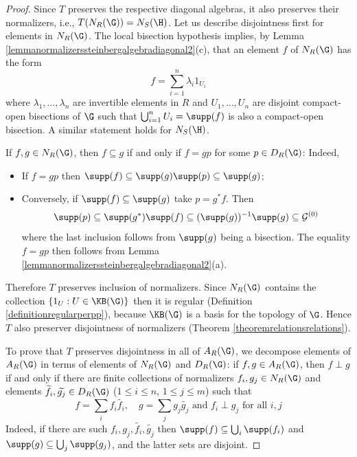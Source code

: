 \begin{proof}
Since $T$ preserves the respective diagonal algebras, it also preserves their normalizers, i.e., $T(N_R(\G))=N_S(\H)$. Let us describe disjointness first for elements in $N_R(\G)$. The local bisection hypothesis implies, by Lemma \ref{lemmanormalizerssteinbergalgebradiagonal2}(c), that an element $f$ of $N_R(\G)$ has the form
\[f=\sum_{i=1}^n\lambda_i1_{U_i}\]
where $\lambda_1,\ldots,\lambda_n$ are invertible elements in $R$ and $U_1,\ldots,U_n$ are disjoint compact-open bisections of $\G$ such that $\bigcup_{i=1}^n U_i=\supp(f)$ is also a compact-open bisection. A similar statement holds for $N_S(\H)$.

If $f,g\in N_R(\G)$, then $f\subseteq g$ if and only if $f=g p$ for some $p\in D_R(\G)$: Indeed,
\begin{itemize}
\item If $f=gp$ then $\supp(f)\subseteq\supp(g)\supp(p)\subseteq\supp(g)$;
\item Conversely, if $\supp(f)\subseteq\supp(g)$ take $p=g^*f$. Then
\[\supp(p)\subseteq\supp(g^*)\supp(f)\subseteq(\supp(g))^{-1}\supp(g)\subseteq\mathcal{G}^{(0)}\]
where the last inclusion follows from $\supp(g)$ being a bisection. The equality $f=gp$ then follows from Lemma \ref{lemmanormalizerssteinbergalgebradiagonal2}(a).
\end{itemize}

Therefore $T$ preserves inclusion of normalizers. Since $N_R(\G)$ contains the collection $\left\{1_U:U\in\KB(\G)\right\}$ then it is regular (Definition \ref{definitionregularperpp}), because $\KB(\G)$ is a basis for the topology of $\G$. Hence $T$ also preserver disjointness of normalizers (Theorem \ref{theoremrelationsrelations}).

To prove that $T$ preserves disjointness in all of $A_R(\G)$, we decompose elements of $A_R(\G)$ in terms of elements of $N_R(\G)$ and $D_R(\G)$: if $f,g\in A_R(\G)$, then $f\perp g$ if and only if there are finite collections of normalizers $f_i,g_j\in N_R(\G)$ and elements $\widetilde{f_i},\widetilde{g_j}\in D_R(\G)$ ($1\leq i\leq n$, $1\leq j\leq m$) such that
\[f=\sum_i f_i\widetilde{f_i},\quad g=\sum_j g_j\widetilde{g_j}\text{ and }f_i\perp g_j\text{ for all }i,j\]
Indeed, if there are such $f_i,g_j,\widetilde{f_i},\widetilde{g_j}$ then $\supp(f)\subseteq\bigcup_i\supp(f_i)$ and $\supp(g)\subseteq\bigcup_j\supp(g_j)$, and the latter sets are disjoint.


\end{proof}
